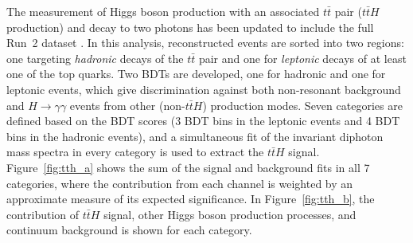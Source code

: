 \documentclass{moriond}
\def\ttbar{\ensuremath{t\bar{t}}\xspace}
\def\tth{\ensuremath{t\bar{t}H}\xspace}
\begin{document}
The measurement of Higgs boson production with an associated \ttbar pair (\tth production) and decay
to two photons has been updated to include the full Run~2 dataset \cite{ATLAS-CONF-2019-004}.
In this analysis, reconstructed events are sorted into two regions: one targeting {\itshape hadronic} decays
of the \ttbar pair and one for {\itshape leptonic} decays of at least one of the top quarks. Two BDTs are developed, one
for hadronic and one for leptonic events, which give discrimination against both non-resonant
background and $H{\rightarrow}\gamma\gamma$ events from other (non-\tth) production modes. Seven categories are defined based on the BDT scores
(3 BDT bins in the leptonic events and 4 BDT bins in the hadronic events), and a 
simultaneous fit of the invariant diphoton mass spectra in every category is used to extract the
\tth signal.
Figure~\ref{fig:tth_a} shows the sum of the signal and background fits in all 7 categories, where
the contribution from each channel is weighted by an approximate measure of its expected significance.
In Figure~\ref{fig:tth_b}, the contribution of \tth signal, other Higgs boson
production processes, and continuum background is shown for each category.
\end{document}
